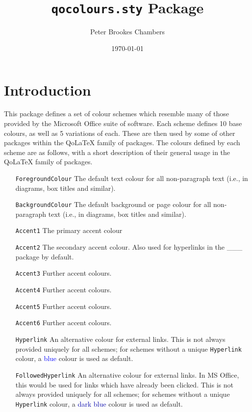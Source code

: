 \documentclass[]{article}
\title{\texttt{qocolours.sty} Package}
\author{Peter Brookes Chambers}
\date{\today{}}
\newcommand{\qo}{Qo\LaTeX}
\begin{document}
\setlength\parskip{1.5em}
\newif\ifcols
\colsfalse
\newif\ifcolstest
\colstesttrue
\setlength\columnsep{2cm}
\setlength{\columnseprule}{0.4pt}

\maketitle
\clearpage

\tableofcontents
\clearpage


  \section{Introduction}
  This package defines a set of colour schemes which resemble many of those provided by the Microsoft Office suite of software. Each scheme defines 10 base colours, as well as 5 variations of each. These are then used by some of other packages within the \qo{} family of packages. The colours defined by each scheme are as follows, with a short description of their general usage in the \qo{} family of packages.

  \begin{itemize}[leftmargin = 1.75in, labelsep = 0.75cm]
    \item [\texttt{ForegroundColour}] The default text colour for all non-paragraph text (i.e., in diagrams, box titles and similar).
    \item [\texttt{BackgroundColour}] The default background or page colour for all non-paragraph text (i.e., in diagrams, box titles and similar).
    \item [\texttt{Accent1}] The primary accent colour
    \item [\texttt{Accent2}] The secondary accent colour. Also used for hyperlinks in the \color{red}\_\_\_\normalcolor{} package by default.
    \item [\texttt{Accent3}] Further accent colours.
    \item [\texttt{Accent4}] Further accent colours.
    \item [\texttt{Accent5}] Further accent colours.
    \item [\texttt{Accent6}] Further accent colours.
    \item[\texttt{Hyperlink}] An alternative colour for external links. This is not always provided uniquely for all schemes; for schemes without a unique \texttt{Hyperlink} colour, a \textcolor[HTML]{0000FF}{blue} colour is used as default.
    \item[\texttt{FollowedHyperlink}] An alternative colour for external links. In MS Office, this would be used for links which have already been clicked. This is not always provided uniquely for all schemes; for schemes without a unique \texttt{Hyperlink} colour, a \textcolor[HTML]{0000AA}{dark blue} colour is used as default.
  \end{itemize}
\end{document}
